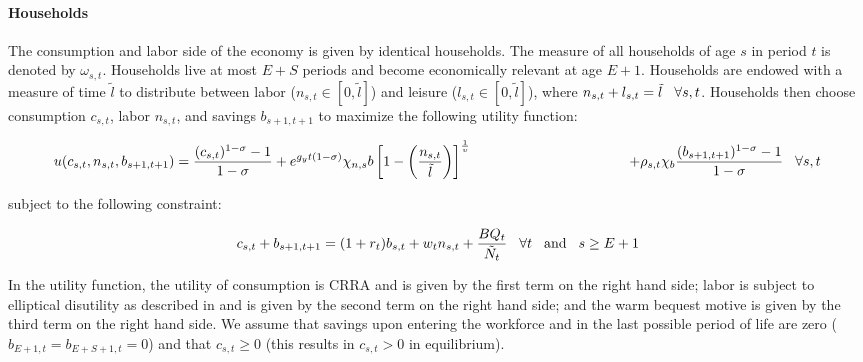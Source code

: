 \documentclass[10pt]{article}
\numberwithin{equation}{subsection}
\begin{document}
\begin{appendices}

\paragraph{Households}

\par The consumption and labor side of the economy is given by identical households. The measure of all households of age \(s\) in period \(t\) is denoted by \(\omega_{s,t}\). Households live at most \(E+S\) periods and become economically relevant at age \(E+1\). Households are endowed with a measure of time \(\tilde{l}\) to distribute between labor (\(n_{s,t} \in [0,\tilde{l}]\)) and leisure (\(l_{s,t} \in [0,\tilde{l}]\)), where \(n_{s,t} + l_{s,t} = \tilde{l} \hspace{3mm} \forall s, t\). Households then choose consumption \(c_{s,t}\), labor \(n_{s,t}\), and savings \(b_{s+1,t+1}\) to maximize the following utility function:

\begin{dmath}
   {u(c_{s,t}, n_{s,t}, b_{s+1,t+1}) = \frac{(c_{s,t})^{1-\sigma}-1}{1-\sigma} + e^{g_yt(1-\sigma)}\chi_{n,s}b\left[1-\left(\frac{n_{s,t}}{\tilde{l}}\right)\right]^{\frac{1}{\upsilon}}} \label{eq:hh_utility} \\
   {\hspace{40mm} + \rho_{s,t}\chi_b\frac{(b_{s+1,t+1})^{1-\sigma}-1}{1-\sigma} \hspace{3mm} \forall s,t}
\end{dmath}

\noindent subject to the following constraint:

\begin{equation}
   c_{s,t} + b_{s+1,t+1} = (1+r_t)b_{s,t} + w_tn_{s,t} + \frac{BQ_t}{\tilde{N}_t} \hspace{3mm} \forall t \hspace{3mm} \text{and} \hspace{3mm} s \geq E+1
\end{equation}

\par In the utility function, the utility of consumption is CRRA and is given by the first term on the right hand side; labor is subject to elliptical disutility as described in \cite{DE2018} and is given by the second term on the right hand side; and the warm bequest motive is given by the third term on the right hand side. We assume that savings upon entering the workforce and in the last possible period of life are zero (\(b_{E+1,t} = b_{E+S+1,t} = 0\)) and that \(c_{s,t} \geq 0\) (this results in \(c_{s,t} > 0\) in equilibrium).


\end{appendices}
\end{document}
